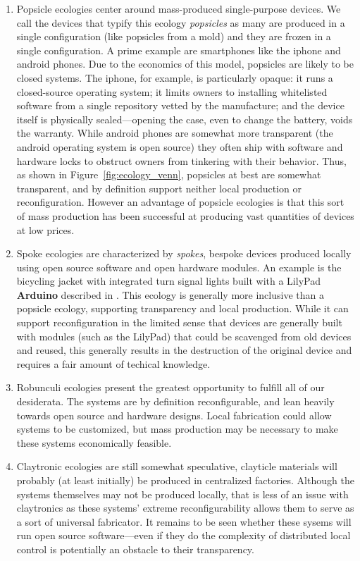 \begin{enumerate}

\item Popsicle ecologies center around mass-produced single-purpose devices. We call the devices that typify this ecology \emph{popsicles} as many are produced in a single configuration (like popsicles from a mold) and they are frozen in a single configuration. 
A prime example are smartphones like the iphone and android phones.
Due to the economics of this model, popsicles are likely to be closed systems. 
The iphone, for example, is particularly opaque: it runs a closed-source operating system; it limits owners to installing whitelisted software from a single repository vetted by the manufacture; and the device itself is physically sealed---opening the case, even to change the battery, voids the warranty. 
While android phones are somewhat more transparent (the android operating system is open source) they often ship with software and hardware locks to obstruct owners from tinkering with their behavior.
Thus, as shown in Figure~\ref{fig:ecology_venn}, popsicles at best are somewhat transparent, and by definition support neither local production or reconfiguration. 
However an advantage of popsicle ecologies is that this sort of mass production has been successful at producing vast quantities of devices at low prices.

\item Spoke ecologies are characterized by \emph{spokes}, bespoke devices produced locally using open source software and open hardware modules.
An example is the bicycling jacket with integrated turn signal lights built with a LilyPad \textbf{Arduino} described in \citep{buechley_wild_lilypads}. 
This ecology is generally more inclusive than a popsicle ecology, supporting transparency and local production. 
While it can support reconfiguration in the limited sense that devices are generally built with modules (such as the LilyPad) that could be scavenged from old devices and reused, this generally results in the destruction of the original device and requires a fair amount of techical knowledge.

\item Robunculi ecologies present the greatest opportunity to fulfill all of our desiderata. The systems are by definition reconfigurable, and lean heavily towards open source and hardware designs. Local fabrication could allow systems to be customized, but mass production may be necessary to make these systems economically feasible.

\item Claytronic ecologies are still somewhat speculative, clayticle materials will probably (at least initially) be produced in centralized factories. 
Although the systems themselves may not be produced locally, that is less of an issue with claytronics as these systems' extreme reconfigurability allows them to serve as a sort of universal fabricator. 
It remains to be seen whether these sysems will run open source software---even if they do the complexity of distributed local control is potentially an obstacle to their transparency. 

\end{enumerate} 

